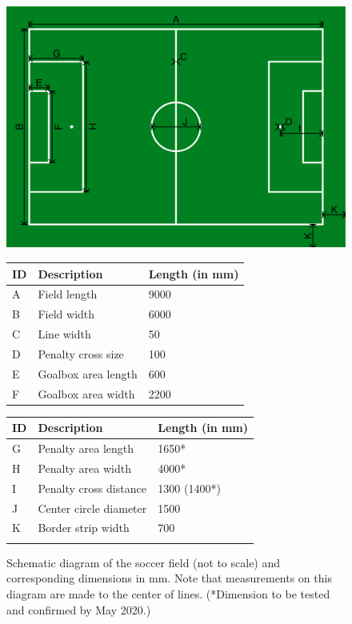 \documentclass[12pt]{article}
\begin{document}
\begin{figure}[b!]
\centering
\centerline{\includegraphics[width=\columnwidth]{figs/fieldDimensions2020.pdf}}
\vspace{1ex}
\begin{tabular}{| l | l | l |}
ID & Description & Length (in mm) \\
\hline \hline
A & Field length & 9000 \\
\hline
B & Field width & 6000 \\
\hline
C & Line width & 50 \\
\hline
D & Penalty cross size & 100 \\
\hline
E & Goalbox area length & 600 \\
\hline
F & Goalbox area width & 2200 \\
\end{tabular}
\begin{tabular}{|l|l|l|}
ID & Description & Length (in mm) \\
\hline \hline
G & Penalty area length & 1650* \\
\hline
H & Penalty area width & 4000* \\
\hline
I & Penalty cross distance & 1300 (1400*) \\
\hline
J & Center circle diameter & 1500 \\
\hline
K & Border strip width & 700 \\
\hline
 &  &  \\
\end{tabular}
\caption{Schematic diagram of the soccer field (not to scale) and corresponding dimensions in mm.  Note that measurements on this diagram are made to the center of lines.
(*Dimension to be tested and confirmed by May 2020.)} \label{fig:field_dim}
\end{figure}
\end{document}
